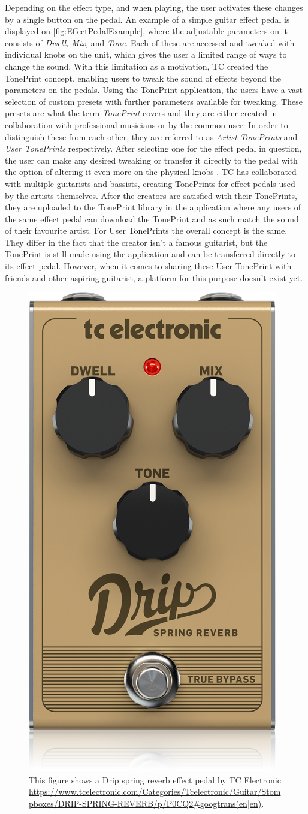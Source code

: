Depending on the effect type, and when playing, the user activates these changes by a single button on the pedal. An example of a simple guitar effect pedal is displayed on \autoref{fig:EffectPedalExample}, where the adjustable parameters on it consists of \textit{Dwell, Mix,} and \textit{Tone}. Each of these are accessed and tweaked with individual knobs on the unit, which gives the user a limited range of ways to change the sound. With this limitation as a motivation, TC created the TonePrint concept, enabling users to tweak the sound of effects beyond the parameters on the pedals. Using the TonePrint application, the users have a vast selection of custom presets with further parameters available for tweaking. These presets are what the term \textit{TonePrint} covers and they are either created in collaboration with professional musicians or by the common user. In order to distinguish these from each other, they are referred to as \textit{Artist TonePrints} and \textit{User TonePrints} respectively. After selecting one for the effect pedal in question, the user can make any desired tweaking or transfer it directly to the pedal with the option of altering it even more on the physical knobs \parencite{PDF:TonePrintAnalyse}. TC has collaborated with multiple guitarists and bassists, creating TonePrints for effect pedals used by the artists themselves. After the creators are satisfied with their TonePrints, they are uploaded to the TonePrint library in the application where any users of the same effect pedal can download the TonePrint and as such match the sound of their favourite artist. For User TonePrints the overall concept is the same. They differ in the fact that the creator isn't a famous guitarist, but the TonePrint is still made using the application and can be transferred directly to its effect pedal. However, when it comes to sharing these User TonePrint with friends and other aspiring guitarist, a platform for this purpose doesn't exist yet.


\begin{figure}[H]
	\centering
	\includegraphics[width=.20\textwidth]{Graphics/EffectPedalExample}
	 \caption{This figure shows a Drip spring reverb effect pedal by TC Electronic \url{https://www.tcelectronic.com/Categories/Tcelectronic/Guitar/Stompboxes/DRIP-SPRING-REVERB/p/P0CQ2\#googtrans(en|en)}.}
    \label{fig:EffectPedalExample}
\end{figure}


